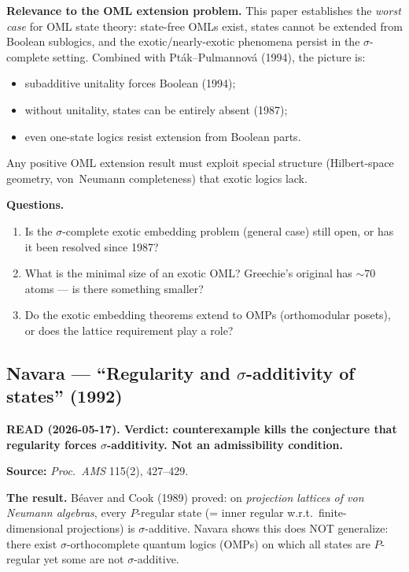 \textbf{Relevance to the OML extension problem.}  This paper
establishes the \emph{worst case} for OML state theory: state-free
OMLs exist, states cannot be extended from Boolean sublogics, and
the exotic/nearly-exotic phenomena persist in the $\sigma$-complete
setting.  Combined with Pt\'{a}k--Pulmannov\'{a} (1994), the picture
is:
\begin{itemize}[nosep]
  \item subadditive unitality forces Boolean (1994);
  \item without unitality, states can be entirely absent (1987);
  \item even one-state logics resist extension from Boolean parts.
\end{itemize}
Any positive OML extension result must exploit special structure
(Hilbert-space geometry, von~Neumann completeness) that exotic logics
lack.

\textbf{Questions.}

\begin{enumerate}[nosep]
  \item Is the $\sigma$-complete exotic embedding problem (general
    case) still open, or has it been resolved since 1987?
  \item What is the minimal size of an exotic OML?  Greechie's
    original has $\sim 70$ atoms --- is there something smaller?
  \item Do the exotic embedding theorems extend to OMPs (orthomodular
    posets), or does the lattice requirement play a role?
\end{enumerate}

\subsection*{Navara --- ``Regularity and $\sigma$-additivity of states''
(1992)}

\textbf{READ (2026-05-17).  Verdict: counterexample kills the
conjecture that regularity forces $\sigma$-additivity.  Not an
admissibility condition.}

\medskip\noindent
\textbf{Source:} \emph{Proc.\ AMS} 115(2), 427--429.

\medskip\noindent
\textbf{The result.}  B\'{e}aver and Cook (1989) proved: on
\emph{projection lattices of von Neumann algebras}, every
$P$-regular state (= inner regular w.r.t.\ finite-dimensional
projections) is $\sigma$-additive.  Navara shows this does NOT
generalize: there exist $\sigma$-orthocomplete quantum logics
(OMPs) on which all states are $P$-regular yet some are not
$\sigma$-additive.


